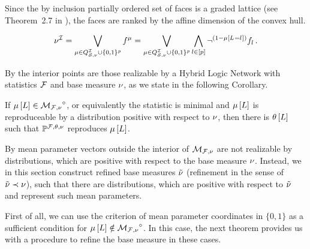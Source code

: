 
Since the by inclusion partially ordered set of faces is a graded lattice (see Theorem~2.7 in \cite{ziegler_lectures_2013}), the faces are ranked by the affine dimension of the convex hull. %

\begin{align*}
	\nu^{\mathcal{I}}
	= \bigvee_{\mu\in Q^{\mathcal{I}}_{\mathcal{S},\nu}\cup\{0,1\}^{p}} f^{\mu}
	= \bigvee_{\mu\in Q^{\mathcal{I}}_{\mathcal{S},\nu}\cup\{0,1\}^{p}} \bigwedge_{l\in[p]} \lnot^{(1-\mu\left[L_{}=l_{}\right])} f_{l} \, .
\end{align*}



By  the interior points are those realizable by a Hybrid Logic Network with statistics $\mathcal{F}$ and base measure $\nu$, as we state in the following Corollary.

\begin{corollary}\label{cor:interiorCharacterizationHLN}
	If $\mu\left[L\right]\in{\mathcal{M}_{\mathcal{F},\nu}}^{\circ}$, or equivalently the statistic is minimal and $\mu\left[L\right]$ is reproduceable by a distribution positive with respect to $\nu$, then there is $\theta\left[L\right]$ such that $\mathbb{P}^{\mathcal{F},\theta,\nu}$ reproduces $\mu\left[L\right]$.
\end{corollary}


By  mean parameter vectors outside the interior of $\mathcal{M}_{\mathcal{F},\nu}$ are not realizable by distributions, which are positive with respect to the base measure $\nu$.
Instead, we in this section construct refined base measures $\tilde{\nu}$ (refinement in the sense of $\tilde{\nu}\prec\nu$), such that there are distributions, which are positive with respect to $\tilde{\nu}$ and represent such mean parameters.


First of all, we can use the criterion of mean parameter coordinates in $\{0,1\}$ as a sufficient condition for $\mu\left[L\right]\notin{\mathcal{M}_{\mathcal{F},\nu}}^{\circ}$.
In this case, the next theorem provides us with a procedure to refine the base measure in these cases.

